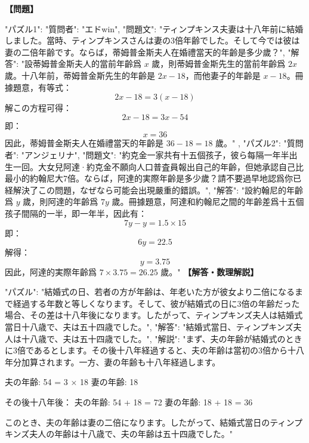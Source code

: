 \documentclass[10pt,a4paper,oneside,openany]{ltjsbook}
\begin{document}
\begin{tcolorbox}[colback=softblue,colframe=primaryblue,title=\textbf{第 43 問：MRS. TIMPKINS'S AGE.},arc=2mm,boxrule=1pt,breakable]
\textbf{【問題】}\par\vspace{0.3em}
{
  "パズル1": {
    "質問者": "エドwin",
    "問題文": "ティンプキンス夫妻は十八年前に結婚しました。當時、ティンプキンスさんは妻の3倍年齢でした。そして今では彼は妻の二倍年齢です。ならば，蒂姆普金斯夫人在婚禮當天的年齡是多少歲？",
    "解答": "設蒂姆普金斯夫人的當前年齡爲 \( x \) 歲，則蒂姆普金斯先生的當前年齡爲 \( 2x \) 歲。十八年前，蒂姆普金斯先生的年齡是 \( 2x - 18 \)，而他妻子的年齡是 \( x - 18 \)。冊據題意，有等式：\[ 2x - 18 = 3(x - 18) \] 解この方程可得：\[ 2x - 18 = 3x - 54 \] 即：\[ x = 36 \] 因此，蒂姆普金斯夫人在婚禮當天的年齡是 \( 36 - 18 = 18 \) 歲。"
  },
  "パズル2": {
    "質問者": "アンジェリナ",
    "問題文": "約克金一家共有十五個孩子，彼ら每隔一年半出生一回。大女兒阿達·約克金不願向人口普査員報出自己的年齡，但她承認自己比最小的約翰尼大7倍。ならば，阿達的実際年齡是多少歲？請不要過早地認爲你已経解決了この問題，なぜなら可能会出現嚴重的錯誤。",
    "解答": "設約翰尼的年齡爲 \( y \) 歲，則阿達的年齡爲 \( 7y \) 歲。冊據題意，阿達和約翰尼之間的年齡差爲十五個孩子間隔的一半，即一年半，因此有：\[ 7y - y = 1.5 \times 15 \] 即：\[ 6y = 22.5 \] 解得：\[ y = 3.75 \] 因此，阿達的実際年齡爲 \( 7 \times 3.75 = 26.25 \) 歲。"
  }
}
\tcblower
\textbf{【解答・数理解説】}\par\vspace{0.3em}
{
"パズル": "結婚式の日、若者の方が年齢は、年老いた方が彼女より二倍になるまで経過する年数と等しくなります。そして、彼が結婚式の日に3倍の年齢だった場合、その差は十八年後になります。したがって、ティンプキンズ夫人は結婚式當日十八歳で、夫は五十四歳でした。",
"解答": "結婚式當日、ティンプキンズ夫人は十八歳で、夫は五十四歳でした。",
"解説": "まず、夫の年齢が結婚式のときに3倍であるとします。その後十八年経過すると、夫の年齢は當初の3倍から十八年分加算されます。一方、妻の年齢も十八年経過します。

夫の年齢: 54 = 3 × 18
妻の年齢: 18

その後十八年後：
夫の年齢: 54 + 18 = 72
妻の年齢: 18 + 18 = 36

このとき、夫の年齢は妻の二倍になります。したがって、結婚式當日のティンプキンズ夫人の年齢は十八歳で、夫の年齢は五十四歳でした。"
}
\end{tcolorbox}
\end{document}
